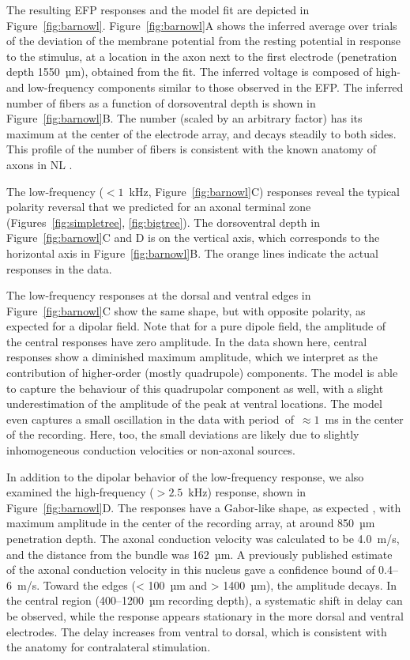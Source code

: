 \documentclass[]{elife}
\begin{document}
The resulting EFP responses and the model fit are depicted in
Figure~\ref{fig:barnowl}. Figure~\ref{fig:barnowl}A shows the inferred
average over trials of the deviation of the membrane potential from the
resting potential in response to the stimulus, at a location in the axon
next to the first electrode (penetration depth 1550~µm), obtained from
the fit. The inferred voltage is composed of high- and low-frequency
components similar to those observed in the EFP. The inferred number of
fibers as a function of dorsoventral depth is shown in
Figure~\ref{fig:barnowl}B. The number (scaled by an arbitrary factor)
has its maximum at the center of the electrode array, and decays
steadily to both sides. This profile of the number of fibers is
consistent with the known anatomy of axons in NL
\citep{carr90, Kuokkanen2010Origin}.

The low-frequency (\(<1\)~kHz, Figure~\ref{fig:barnowl}C) responses
reveal the typical polarity reversal that we predicted for an axonal
terminal zone (Figures~\ref{fig:simpletree}, \ref{fig:bigtree}). The
dorsoventral depth in Figure~\ref{fig:barnowl}C and D is on the vertical
axis, which corresponds to the horizontal axis in
Figure~\ref{fig:barnowl}B. The orange lines indicate the actual
responses in the data.

The low-frequency responses at the dorsal and ventral edges in
Figure~\ref{fig:barnowl}C show the same shape, but with opposite
polarity, as expected for a dipolar field. Note that for a pure dipole
field, the amplitude of the central responses have zero amplitude. In
the data shown here, central responses show a diminished maximum
amplitude, which we interpret as the contribution of higher-order
(mostly quadrupole) components. The model is able to capture the
behaviour of this quadrupolar component as well, with a slight
underestimation of the amplitude of the peak at ventral locations. The
model even captures a small oscillation in the data with
period~of~\(\approx 1\)~ms in the center of the recording. Here, too,
the small deviations are likely due to slightly inhomogeneous conduction
velocities or non-axonal sources.

In addition to the dipolar behavior of the low-frequency response, we
also examined the high-frequency (\(> 2.5\)~kHz) response, shown in
Figure~\ref{fig:barnowl}D. The responses have a Gabor-like shape, as
expected \citep{wagner09}, with maximum amplitude in the center of the
recording array, at around 850~µm penetration depth. The axonal
conduction velocity was calculated to be 4.0~m/s, and the distance from
the bundle was 162~µm. A previously published estimate of the axonal
conduction velocity in this nucleus \citep{McColgan2014Functional} gave
a confidence bound of 0.4--6~m/s. Toward the edges (\textless{} 100~µm
and \textgreater{} 1400~µm), the amplitude decays. In the central region
(400--1200~µm recording depth), a systematic shift in delay can be
observed, while the response appears stationary in the more dorsal and
ventral electrodes. The delay increases from ventral to dorsal, which is
consistent with the anatomy for contralateral stimulation.
\end{document}
